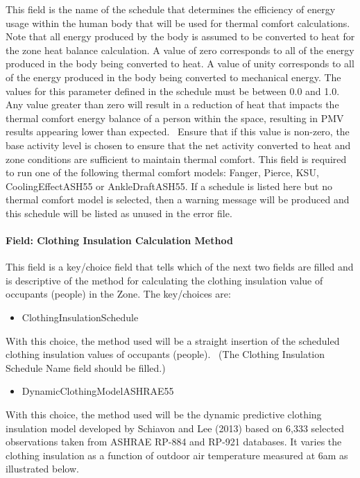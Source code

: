 This field is the name of the schedule that determines the efficiency of energy usage within the human body that will be used for thermal comfort calculations. Note that all energy produced by the body is assumed to be converted to heat for the zone heat balance calculation. A value of zero corresponds to all of the energy produced in the body being converted to heat. A value of unity corresponds to all of the energy produced in the body being converted to mechanical energy. The values for this parameter defined in the schedule must be between 0.0 and 1.0. Any value greater than zero will result in a reduction of heat that impacts the thermal comfort energy balance of a person within the space, resulting in PMV results appearing lower than expected.~ Ensure that if this value is non-zero, the base activity level is chosen to ensure that the net activity converted to heat and zone conditions are sufficient to maintain thermal comfort. This field is required to run one of the following thermal comfort models: Fanger, Pierce, KSU, CoolingEffectASH55 or AnkleDraftASH55. If a schedule is listed here but no thermal comfort model is selected, then a warning message will be produced and this schedule will be listed as unused in the error file.

\paragraph{Field: Clothing Insulation Calculation Method}\label{field-clothing-insulation-calculation-method}

This field is a key/choice field that tells which of the next two fields are filled and is descriptive of the method for calculating the clothing insulation value of occupants (people) in the Zone. The key/choices are:

\begin{itemize}
\tightlist
\item
  ClothingInsulationSchedule
\end{itemize}

With this choice, the method used will be a straight insertion of the scheduled clothing insulation values of occupants (people).~ (The Clothing Insulation Schedule Name field should be filled.)

\begin{itemize}
\tightlist
\item
  DynamicClothingModelASHRAE55
\end{itemize}

With this choice, the method used will be the dynamic predictive clothing insulation model developed by Schiavon and Lee (2013) based on 6,333 selected observations taken from ASHRAE RP-884 and RP-921 databases. It varies the clothing insulation as a function of outdoor air temperature measured at 6am as illustrated below.

